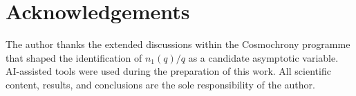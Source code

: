 \documentclass[11pt,a4paper]{article}
\theoremstyle{definition}
\begin{document}
  \section*{Acknowledgements}

    The author thanks the extended discussions within the Cosmochrony programme
    that shaped the identification of $n_1(q)/q$ as a candidate asymptotic variable.
    AI-assisted tools were used during the preparation of this work.
    All scientific content, results, and conclusions are the sole responsibility
    of the author.
    \clearpage
    
    
\end{document}
